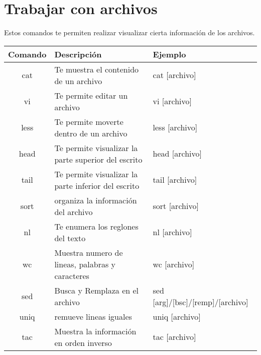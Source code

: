\documentclass[12pt]{article}
\begin{document}
\section{Trabajar con archivos}
Estos comandos te permiten realizar visualizar cierta información de los archivos. \\
\begin{tabular}{|c|l|l|} 
\hline
Comando & Descripción & Ejemplo \\ \hline
cat & Te muestra el contenido de un archivo & cat [archivo] \\ \hline
vi & Te permite editar un archivo & vi [archivo] \\ \hline
less & Te permite moverte dentro de un archivo & less [archivo]\\ \hline
head & Te permite visualizar la parte superior del escrito & head [archivo]  \\ \hline
tail & Te permite visualizar la parte inferior del escrito & tail [archivo]  \\ \hline
sort & organiza la información del archivo & sort [archivo] \\ \hline
nl & Te enumera los reglones del texto & nl [archivo] \\ \hline
wc & Muestra numero de lineas, palabras y caracteres & wc [archivo] \\ \hline
sed & Busca y Remplaza en el archivo & sed [arg]/[bsc]/[remp]/[archivo] \\ \hline
uniq & remueve lineas iguales & uniq [archivo] \\ \hline
tac & Muestra la información en orden inverso & tac [archivo]\\ \hline
\end{tabular}
\end{document}
